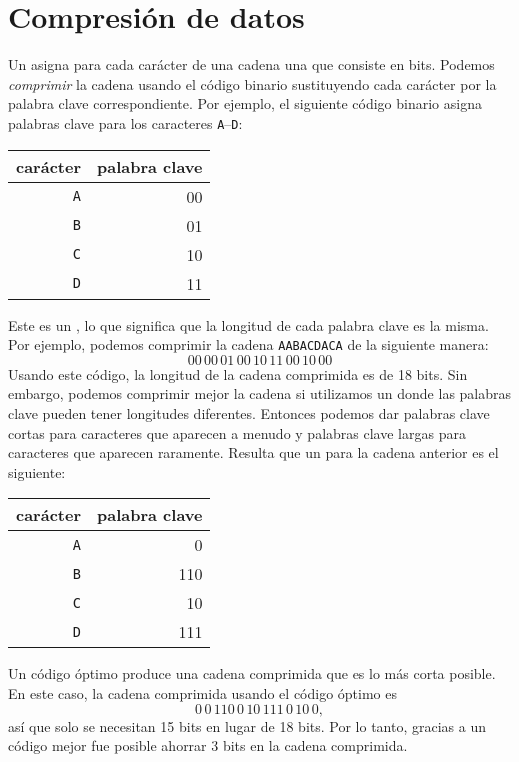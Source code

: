 \section{Compresión de datos}


Un  asigna para cada carácter
de una cadena una  que consiste en bits.
Podemos \emph{comprimir} la cadena usando el código binario
sustituyendo cada carácter por la
palabra clave correspondiente.
Por ejemplo, el siguiente código binario
asigna palabras clave para los caracteres
\texttt{A}--\texttt{D}:
\begin{center}
  \begin{tabular}{rr}
    carácter   & palabra clave \\
    \hline
    \texttt{A} & 00            \\
    \texttt{B} & 01            \\
    \texttt{C} & 10            \\
    \texttt{D} & 11            \\
  \end{tabular}
\end{center}
Este es un ,
lo que significa que la longitud de cada
palabra clave es la misma.
Por ejemplo, podemos comprimir la cadena
\texttt{AABACDACA} de la siguiente manera:
\[00\,00\,01\,00\,10\,11\,00\,10\,00\]
Usando este código, la longitud de la cadena comprimida
es de 18 bits.
Sin embargo, podemos comprimir mejor la cadena
si utilizamos un 
donde las palabras clave pueden tener longitudes diferentes.
Entonces podemos dar palabras clave cortas para
caracteres que aparecen a menudo
y palabras clave largas para caracteres
que aparecen raramente.
Resulta que un 
para la cadena anterior es el siguiente:
\begin{center}
  \begin{tabular}{rr}
    carácter   & palabra clave \\
    \hline
    \texttt{A} & 0             \\
    \texttt{B} & 110           \\
    \texttt{C} & 10            \\
    \texttt{D} & 111           \\
  \end{tabular}
\end{center}
Un código óptimo produce una cadena comprimida
que es lo más corta posible.
En este caso, la cadena comprimida usando
el código óptimo es
\[0\,0\,110\,0\,10\,111\,0\,10\,0,\]
así que solo se necesitan 15 bits en lugar de 18 bits.
Por lo tanto, gracias a un código mejor fue posible
ahorrar 3 bits en la cadena comprimida.

